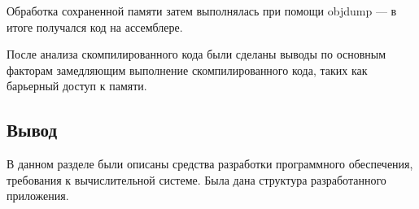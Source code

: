 Обработка сохраненной памяти затем выполнялась при помощи objdump --- в итоге получался код на ассемблере.

После анализа скомпилированного кода были сделаны выводы по основным факторам замедляющим выполнение скомпилированного кода, таких как барьерный доступ к памяти.

\subsection{Вывод}

В данном разделе были описаны средства разработки программного
обеспечения, требования к вычислительной системе. Была дана структура
разработанного приложения.

\pagebreak